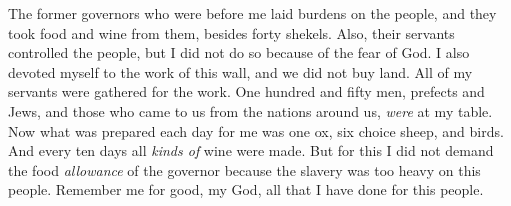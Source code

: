 \begin{biblechapter}
\verse The former governors who were before me laid burdens on the people, and they took food and wine from them, besides forty shekels. Also, their servants controlled the people, but I did not do so because of the fear of God.
\verse I also devoted myself to the work of this wall, and we did not buy land. All of my servants were gathered for the work.
\verse One hundred and fifty men, prefects and Jews, and those who came to us from the nations around us, \textit{were} at my table.
\verse Now what was prepared each day for me was one ox, six choice sheep, and birds. And every ten days all \textit{kinds of} wine were made. But for this I did not demand the food \textit{allowance} of the governor because the slavery was too heavy on this people.
\verse Remember me for good, my God, all that I have done for this people.
\end{biblechapter}

